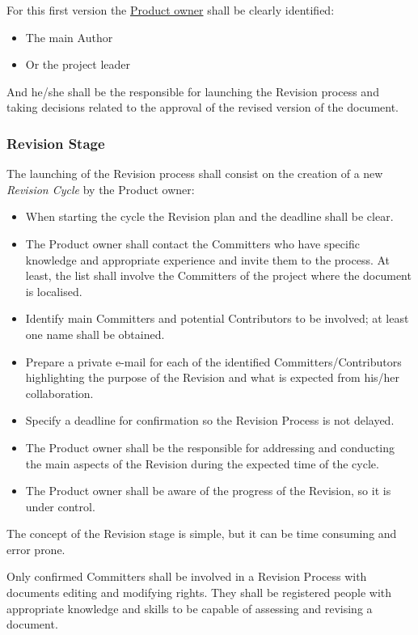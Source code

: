 \documentclass{template/openetcs_article}
\begin{document}
For this first version the \underline{Product owner} shall be clearly identified:
\begin{itemize}
\item The main Author 
\item Or the project leader 
\end{itemize}

And he/she shall be the responsible for launching the Revision process and taking decisions related to the approval of the revised version of the document.

\subsubsection{Revision Stage}

The launching of the Revision process shall consist on the creation of a new {\it Revision Cycle} by the Product owner:
\begin{itemize}
\item When starting the cycle the Revision plan and the deadline shall be clear.  
\item The Product owner shall contact the Committers who have specific knowledge and appropriate experience and invite them to the process. At least, the list shall involve the Committers of the project where the document is localised. 
\item Identify main Committers and potential Contributors to be involved; at least one name shall be obtained.
\item Prepare a private e-mail for each of the identified Committers/Contributors highlighting the purpose of the Revision and what is expected from his/her collaboration.
\item Specify a deadline for confirmation so the Revision Process is not delayed.
\item The Product owner shall be the responsible for addressing and conducting the main aspects of the Revision during the expected time of the cycle. 
\item The Product owner shall be aware of the progress of the Revision, so it is under control. 
\end{itemize}

The concept of the Revision stage is simple, but it can be time consuming and error prone.

Only confirmed Committers shall be involved in a Revision Process with documents editing and modifying rights. They shall be registered people with appropriate knowledge and skills to be capable of assessing and revising a document. 
\end{document}
